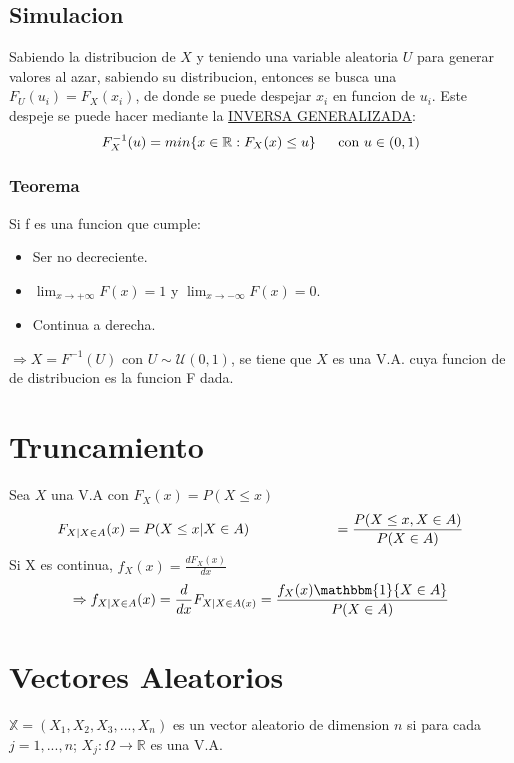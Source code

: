 \documentclass[titlepage,a4paper]{article}
\begin{document}
\subsection{Simulacion}
Sabiendo la distribucion de $X$ y teniendo una variable aleatoria $U$ para generar valores al azar, sabiendo su distribucion, entonces
se busca una $F_{U}(u_{i}) = F_{X}(x_{i})$, de donde se puede despejar $x_{i}$ en funcion de $u_{i}$.
Este despeje se puede hacer mediante la \underline{INVERSA GENERALIZADA}:
\begin{equation*}
    F_{X}^{-1}(u) = min \{x \in \mathbb{R}: F_{X}(x) \leq u \} \hspace{16px} \text{con } u \in (0,1)
\end{equation*}

\subsubsection*{Teorema}
Si f es una funcion que cumple:
\begin{itemize}
    \item Ser no decreciente.
    \item $\lim_{x \to +\infty}F(x) = 1$ y $\lim_{x \to -\infty}F(x) = 0$.
    \item Continua a derecha.
\end{itemize}
$\Rightarrow X = F^{-1}(U)$ con $U \sim \mathcal{U}(0,1)$, se tiene que $X$ es una V.A. cuya funcion de de distribucion es la funcion F dada.

\section{Truncamiento}
Sea $X$ una V.A con $F_{X}(x) = P(X\leq x)$
\begin{equation*}
    F_{X|X \in A}(x) = P(X \leq x | X \in A)\\
    \hspace{60px}=\frac{P(X \leq x, X \in A)}{P(X \in A)}
\end{equation*}
Si X es continua, $f_{X}(x) = \frac{dF_{X}(x)}{dx}$
\begin{equation*}
    \Rightarrow f_{X|X \in A}(x) = \frac{d}{dx}F_{X|X \in A(x)} = \frac{f_{X}(x) \mathbbm{1} \{X \in A\}}{P(X \in A)}
\end{equation*}

\section{Vectores Aleatorios}
$\mathbb{X}  = (X_{1},X_{2},X_{3},...,X_{n})$ es un vector aleatorio de dimension $n$ si para cada $j = 1,...,n$; $X_{j}: \Omega \to \mathbb{R}$ es una
V.A.
\end{document}
